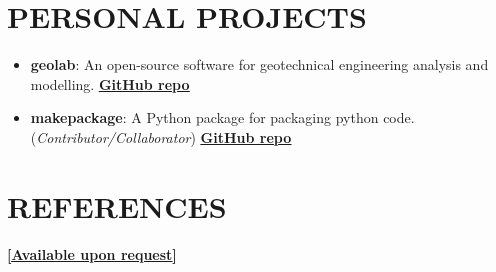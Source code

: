 \documentclass[letterpaper, 12pt]{article}
\newcommand{\cvsection}[1]{
	
	\section*{#1}
}
\begin{document}
	
	\cvsection{PERSONAL PROJECTS}
	
	\begin{itemize}[leftmargin=*]
		
		\item \textbf{geolab}: An open-source software for geotechnical engineering analysis and modelling. \href{https://www.github.com/patrickboateng/geolab}{\underline{\textbf{GitHub repo}}}
		
		\item \textbf{makepackage}: A Python package for packaging python code. (\textit{Contributor/Collaborator})
		\href{https://github.com/nyggus/makepackage}{\underline{\textbf{GitHub repo}}}
		
	\end{itemize}
	
	
	\cvsection{REFERENCES}
	
	\textbf{[\href{mailto:boatengpatrick456@gmail.com}{\underline{Available upon request}}]}
	
	\begin{comment}
	\begin{multicols}{2}
		\textbf{Dr. Jones Owusu Twumasi} \\ [4pt]
		Lecturer, Department of Civil Engineering \\ [4pt]
		Kwame Nkrumah University of Science and Technology \\ [4pt]
		\faEnvelopeSquare \space \href{mailto:jotwumasi@knust.edu.gh}{jotwumasi@knust.edu.gh} \\ [4pt]
		\faPhone \space {+233 244306788} \\ [4pt]
		
		\textbf{Dr. Russel Owusu Afrifa} \\ [4pt]
		Snr. Lecturer, Department of Civil Engineering \\ [4pt]
		Kwame Nkrumah University of Science and Technology \\ [4pt]
		\faEnvelopeSquare \space \href{mailto:roafrifa.coe@knust.edu.gh}{roafrifa.coe@knust.edu.gh} \\ [4pt]
		\faPhone \space {+233 551192818} \\
		
		\columnbreak
		
		\textbf{Ing. Dela Doyen Dakpo} \\ [4pt]
		Project Manager / Structural Engineer \\ [4pt]
		Quatran Services Limited \\ [4pt]
		\faEnvelopeSquare \space \href{mailto:quatranlimited@gmail.com}{quatranlimited@gmail.com}\\[4pt]
		\faPhone \space {+233 247932961} \\ [4pt]

	\end{multicols}
	\end{comment}
	
\end{document}
